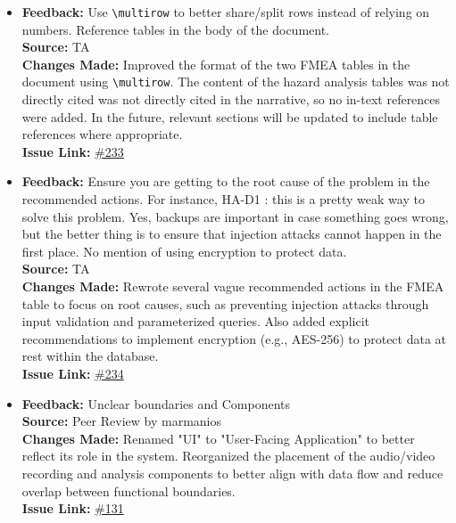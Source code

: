 \documentclass{article}
\begin{document}
\begin{itemize}
    \item 
      \textbf{Feedback:} Use \verb|\multirow| to better share/split rows instead of relying on numbers. Reference tables in the body of the document. \\
      \textbf{Source:} TA \\
      \textbf{Changes Made:} Improved the format of the two FMEA tables in the document using \verb|\multirow|. The content of the hazard analysis tables was not directly cited was not directly cited in the narrative, so no in-text references were added. In the future, relevant sections will be updated to include table references where appropriate.\\
      \textbf{Issue Link:} \href{https://github.com/parishanizam/TeleHealth/issues/233}{\#233}

      \item 
      \textbf{Feedback:} Ensure you are getting to the root cause of the problem in the recommended actions. For instance, HA-D1 : this is a pretty weak way to solve this problem. Yes, backups are important in case something goes wrong, but the better thing is to ensure that injection attacks cannot happen in the first place. No mention of using encryption to protect data.\\
      \textbf{Source:} TA \\
      \textbf{Changes Made:} Rewrote several vague recommended actions in the FMEA table to focus on root causes, such as preventing injection attacks through input validation and parameterized queries. Also added explicit recommendations to implement encryption (e.g., AES-256) to protect data at rest within the database. \\
      \textbf{Issue Link:} \href{https://github.com/parishanizam/TeleHealth/issues/234}{\#234}

      \item 
      \textbf{Feedback:} Unclear boundaries and Components\\
      \textbf{Source:} Peer Review by marmanios \\
      \textbf{Changes Made:} Renamed "UI" to "User-Facing Application" to better reflect its role in the system. Reorganized the placement of the audio/video recording and analysis components to better align with data flow and reduce overlap between functional boundaries. \\
      \textbf{Issue Link:} \href{https://github.com/parishanizam/TeleHealth/issues/131}{\#131}


\end{itemize}
\end{document}
